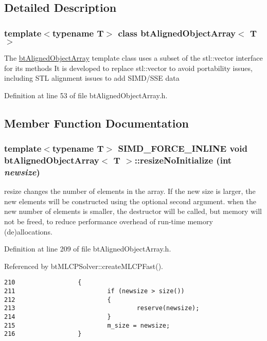 \subsection{Detailed Description}
\subsubsection*{template$<$typename T$>$ class btAlignedObjectArray$<$ T $>$}

The \hyperlink{classbt_aligned_object_array}{btAlignedObjectArray} template class uses a subset of the stl::vector interface for its methods It is developed to replace stl::vector to avoid portability issues, including STL alignment issues to add SIMD/SSE data 

Definition at line 53 of file btAlignedObjectArray.h.

\subsection{Member Function Documentation}
\hypertarget{classbt_aligned_object_array_2cc58c74534181a7a10e5c6ab8b21227}{
\subsubsection[resizeNoInitialize]{\setlength{\rightskip}{0pt plus 5cm}template$<$typename T$>$ SIMD\_\-FORCE\_\-INLINE void {\bf btAlignedObjectArray}$<$ T $>$::resizeNoInitialize (int {\em newsize})}}
\label{classbt_aligned_object_array_2cc58c74534181a7a10e5c6ab8b21227}


resize changes the number of elements in the array. If the new size is larger, the new elements will be constructed using the optional second argument. when the new number of elements is smaller, the destructor will be called, but memory will not be freed, to reduce performance overhead of run-time memory (de)allocations. 

Definition at line 209 of file btAlignedObjectArray.h.

Referenced by btMLCPSolver::createMLCPFast().

\begin{Code}\begin{verbatim}210                 {
211                         if (newsize > size())
212                         {
213                                 reserve(newsize);
214                         }
215                         m_size = newsize;
216                 }
\end{verbatim}
\end{Code}




